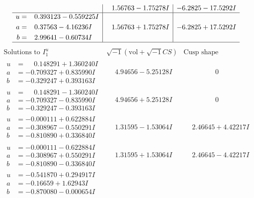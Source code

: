 \documentclass[1p]{elsarticle_modified}
\theoremstyle{definition}
\newcommand{\I}{\sqrt{-1}}
\begin{document}
$$\begin{array}{c|c|c}
 & \phantom{-}1.56763 - 1.75278 I & -6.2825 - 17.5292 I \\ \hline\begin{aligned}
u &= \phantom{-}0.393123 - 0.559225 I \\
a &= \phantom{-}0.37563 - 4.16236 I \\
b &= \phantom{-}2.99641 - 0.60734 I\end{aligned}
 & \phantom{-}1.56763 + 1.75278 I & -6.2825 + 17.5292 I\\
 \hline 
 \end{array}$$\newpage$$\begin{array}{c|c|c}  
\text{Solutions to }I^u_{1}& \I (\text{vol} + \sqrt{-1}CS) & \text{Cusp shape}\\
 \hline 
\begin{aligned}
u &= \phantom{-}0.148291 + 1.360240 I \\
a &= -0.709327 + 0.835990 I \\
b &= -0.329247 + 0.393163 I\end{aligned}
 & \phantom{-}4.94656 - 5.25128 I & \phantom{-0.000000 } 0 \\ \hline\begin{aligned}
u &= \phantom{-}0.148291 - 1.360240 I \\
a &= -0.709327 - 0.835990 I \\
b &= -0.329247 - 0.393163 I\end{aligned}
 & \phantom{-}4.94656 + 5.25128 I & \phantom{-0.000000 } 0 \\ \hline\begin{aligned}
u &= -0.000111 + 0.622884 I \\
a &= -0.308967 - 0.550291 I \\
b &= -0.810890 + 0.336840 I\end{aligned}
 & \phantom{-}1.31595 - 1.53064 I & \phantom{-}2.46645 + 4.42217 I \\ \hline\begin{aligned}
u &= -0.000111 - 0.622884 I \\
a &= -0.308967 + 0.550291 I \\
b &= -0.810890 - 0.336840 I\end{aligned}
 & \phantom{-}1.31595 + 1.53064 I & \phantom{-}2.46645 - 4.42217 I \\ \hline\begin{aligned}
u &= -0.541870 + 0.294917 I \\
a &= -0.16659 + 1.62943 I \\
b &= -0.870080 - 0.000654 I\end{aligned}

\end{array}$$
\end{document}
